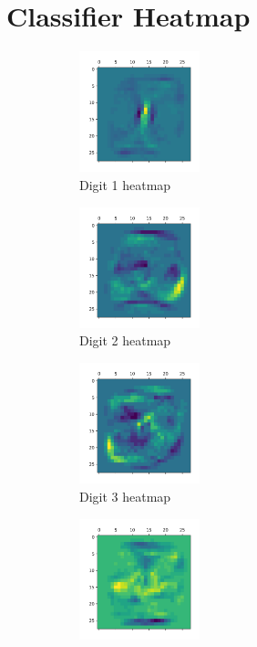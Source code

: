 \documentclass[a4paper]{article}    %
\begin{document}
\section{Classifier Heatmap}

\begin{figure}[H]
    \centering
    \begin{subfigure}{0.24\textwidth}
        \centering
        \includegraphics[width=3.5cm]{digit_1}
        \caption{Digit 1 heatmap}
        \label{fig:digit_1}
    \end{subfigure}
    \hfill
    \begin{subfigure}{0.24\textwidth}
        \centering
        \includegraphics[width=3.5cm]{digit_2}
        \caption{Digit 2 heatmap}
        \label{fig:digit_2}
    \end{subfigure}
    \hfill
    \begin{subfigure}{0.24\textwidth}
        \centering
        \includegraphics[width=3.5cm]{digit_3}
        \caption{Digit 3 heatmap}
        \label{fig:digit_3}
    \end{subfigure}
    \hfill
    \begin{subfigure}{0.24\textwidth}
        \centering
        \includegraphics[width=3.5cm]{digit_4}

\end{subfigure}
\end{figure}
\end{document}
